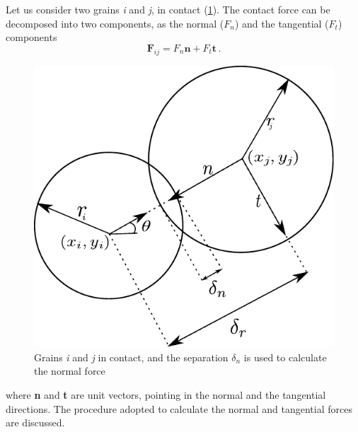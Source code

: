 Let us consider two grains \textit{i} and \textit{j}, in contact 
(\cref{fig:DEM}). The contact force can be decomposed into two components, 
as the normal ($\mathit{F}_{n}$) and the tangential ($\mathit{F}_{t}$) 
components
%
\begin{equation}
 \mathbf{F}_{ij}=F_{n}\mathbf{n}+F_{t}\mathbf{t} \,.
\label{eq:fnt}
\end{equation}

\begin{figure}[htbp]
	\centering
	\includegraphics{DEM}
	\caption[Calculation of normal force in DEM]{Grains \textit{i} and 
	\textit{j} in 
	contact, and the 
	separation $\delta_{n}$ is used to calculate the normal force} 
	\label{fig:DEM}
\end{figure}

where \textbf{n} and \textbf{t} are unit vectors, pointing in the normal and 
the tangential directions. The procedure adopted to calculate the normal and 
tangential forces are discussed.

